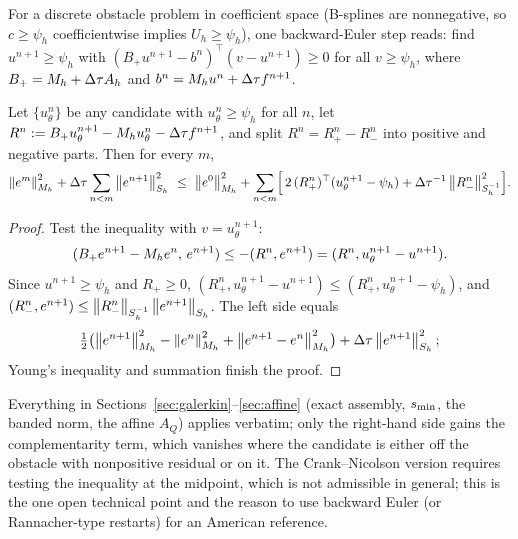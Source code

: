 For a discrete obstacle problem in coefficient space (B-splines are
nonnegative, so $c\ge\psi_h$ coefficientwise implies $U_h\ge\psi_h$), one
backward-Euler step reads: find $u^{n+1}\ge\psi_h$ with
$(B_+u^{n+1}-b^n)^\top(v-u^{n+1})\ge0$ for all $v\ge\psi_h$, where
$B_+=M_h+\Delta\tau A_h$ and $b^n=M_h u^n+\Delta\tau f^{n+1}$.
\begin{theorem}
\label{thm:vi}
Let $\{u_\theta^n\}$ be any candidate with $u_\theta^n\ge\psi_h$ for all $n$,
let $R^n:=B_+u_\theta^{n+1}-M_h u_\theta^n-\Delta\tau f^{n+1}$, and split
$R^n=R^n_+-R^n_-$ into positive and negative parts.  Then for every $m$,
\[
 \left\lVert e^m\right\rVert_{M_h}^2+\Delta\tau\sum_{n<m}\left\lVert e^{n+1}\right\rVert_{S_h}^2
 \ \le\ \left\lVert e^0\right\rVert_{M_h}^2
 +\sum_{n<m}\Bigl[\,2\,(R^n_+)^\top(u_\theta^{n+1}-\psi_h)
 +\Delta\tau^{-1}\left\lVert R^n_-\right\rVert_{S_h^{-1}}^2\Bigr].
\]
\end{theorem}
\begin{proof}
Test the inequality with $v=u_\theta^{n+1}$:
\[
(B_+e^{n+1}-M_h e^n,\,e^{n+1})\le-(R^n,e^{n+1})=(R^n,u_\theta^{n+1}-u^{n+1}).
\]
Since $u^{n+1}\ge\psi_h$ and $R_+\ge0$, $(R^n_+,u_\theta^{n+1}-u^{n+1})\le(R^n_+,u_\theta^{n+1}-\psi_h)$,
and $(R^n_-,e^{n+1})\le\left\lVert R^n_-\right\rVert_{S_h^{-1}}\left\lVert e^{n+1}\right\rVert_{S_h}$.  The left side equals
\[
\tfrac12\bigl(\left\lVert e^{n+1}\right\rVert_{M_h}^2-\left\lVert e^n\right\rVert_{M_h}^2+\left\lVert e^{n+1}-e^n\right\rVert_{M_h}^2\bigr)+\Delta\tau\left\lVert e^{n+1}\right\rVert_{S_h}^2;
\]
Young's inequality and summation finish the proof.
\end{proof}
Everything in Sections~\ref{sec:galerkin}--\ref{sec:affine} (exact assembly, $s_{\min}$, the banded norm,
the affine $A_Q$) applies verbatim; only the right-hand side gains the
complementarity term, which vanishes where the candidate is either off the
obstacle with nonpositive residual or on it.  The Crank--Nicolson version
requires testing the inequality at the midpoint, which is not admissible in
general; this is the one open technical point and the reason to use backward
Euler (or Rannacher-type restarts) for an American reference.
